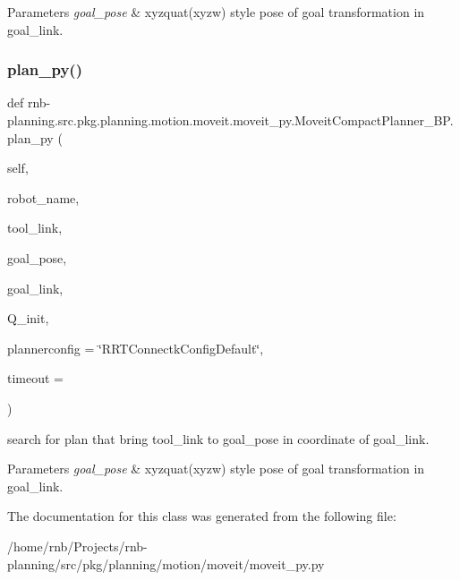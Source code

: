 \begin{DoxyParams}{Parameters}
{\em goal\+\_\+pose} & xyzquat(xyzw) style pose of goal transformation in goal\+\_\+link. \\
\hline
\end{DoxyParams}
\mbox{\label{classrnb-planning_1_1src_1_1pkg_1_1planning_1_1motion_1_1moveit_1_1moveit__py_1_1_moveit_compact_planner___b_p_af7d587144e0c713bff12b9a8adcb657f}} 
\subsubsection{\texorpdfstring{plan\+\_\+py()}{plan\_py()}}
{\footnotesize\ttfamily def rnb-\/planning.\+src.\+pkg.\+planning.\+motion.\+moveit.\+moveit\+\_\+py.\+Moveit\+Compact\+Planner\+\_\+\+B\+P.\+plan\+\_\+py (\begin{DoxyParamCaption}\item[{}]{self,  }\item[{}]{robot\+\_\+name,  }\item[{}]{tool\+\_\+link,  }\item[{}]{goal\+\_\+pose,  }\item[{}]{goal\+\_\+link,  }\item[{}]{Q\+\_\+init,  }\item[{}]{plannerconfig = {\ttfamily \char`\"{}RRTConnectkConfigDefault\char`\"{}},  }\item[{}]{timeout = {} }\end{DoxyParamCaption})}



search for plan that bring tool\+\_\+link to goal\+\_\+pose in coordinate of goal\+\_\+link. 


\begin{DoxyParams}{Parameters}
{\em goal\+\_\+pose} & xyzquat(xyzw) style pose of goal transformation in goal\+\_\+link. \\
\hline
\end{DoxyParams}


The documentation for this class was generated from the following file\+:\begin{DoxyCompactItemize}
\item 
/home/rnb/\+Projects/rnb-\/planning/src/pkg/planning/motion/moveit/moveit\+\_\+py.\+py\end{DoxyCompactItemize}

